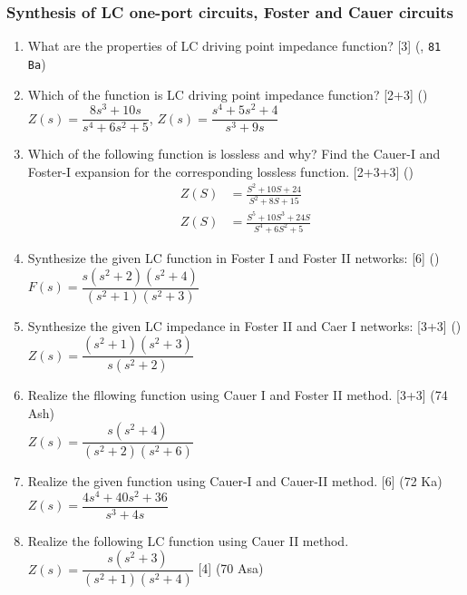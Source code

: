 \documentclass[12pt]{article}
\begin{document}
\subsubsection{Synthesis of LC one-port circuits, Foster and Cauer circuits}
\begin{enumerate}
	\item What are the properties of LC driving point impedance function? \hfill [3] (, \texttt{81 Ba})
	
	\item Which of the function is LC driving point impedance function? \hfill [2+3] ()\\
	$Z(s) = \dfrac{8s^3+10s}{s^4+6s^2+5}$, \hspace{1cm} $Z(s) = \dfrac{s^4+5s^2+4}{s^3+9s}$

	\item Which of the following function is lossless and why? Find the Cauer-I and Foster-I expansion for the corresponding lossless function. \hfill [2+3+3] ()
\begin{align*}
Z(S) &= \frac{S^2+10S+24}{S^2+8S+15}\\
Z(S) &= \frac{S^5+10S^3+24S}{S^4+6S^2+5}
\end{align*}

	\item Synthesize the given LC function in Foster I and Foster II networks: \hfill [6] ()\\
	$F(s) = \dfrac{s(s^2+2)(s^2+4)}{(s^2+1)(s^2+3)}$
	
	\item Synthesize the given LC impedance in Foster II and Caer I networks: \hfill [3+3] ()\\
	$Z(s) = \dfrac{(s^2+1)(s^2+3)}{s(s^2+2)}$
	
	\item Realize the fllowing function using Cauer I and Foster II method. \hfill [3+3] (74 Ash)\\
	$Z(s) = \dfrac{s(s^2+4)}{(s^2+2)(s^2+6)}$
	
	\item Realize the given function using Cauer-I and Cauer-II method. \hfill [6] (72 Ka)\\
	$Z(s) = \dfrac{4s^4+40s^2+36}{s^3+4s}$
	
	\item Realize the following LC function using Cauer II method. $Z(s) = \dfrac{s(s^2+3)}{(s^2+1)(s^2+4)}$ \hfill [4] (70 Asa)
	

\end{enumerate}
\end{document}
